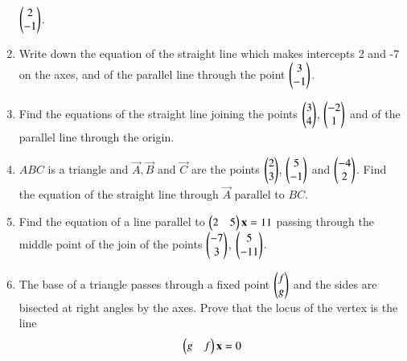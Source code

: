 \begin{enumerate}[label=\arabic*.,ref=\thesubsection.\theenumi]
$\begin{pmatrix}2\\-1\end{pmatrix}$.
\item Write down the equation of the straight line which makes intercepts 2 and -7 on the axes, and of the parallel line through
the point $\begin{pmatrix}3\\-1\end{pmatrix}$.
\item Find the equations of the straight line joining the points $\begin{pmatrix}3\\4\end{pmatrix}$, $\begin{pmatrix}-2\\1\end{pmatrix}$ and of the parallel line through
the origin.
\item $ABC$ is a triangle and $\vec{A}, \vec{B}$ and $\vec{C}$ are the points $\begin{pmatrix}2\\3\end{pmatrix}$, $\begin{pmatrix}5\\-1\end{pmatrix}$ and $\begin{pmatrix}-4\\2\end{pmatrix}$.  Find the equation
of the straight line through $\vec{A}$ parallel to $BC$.
\item Find the equation of a line parallel to $\begin{pmatrix}2 & 5\end{pmatrix}\mathbf{x}=11$ passing through the middle point of the join of the points $\begin{pmatrix}-7\\3\end{pmatrix}$, $\begin{pmatrix}5\\-11\end{pmatrix}$.
\item The base of a triangle passes through a fixed point $\begin{pmatrix}f\\g\end{pmatrix}$ and the sides are bisected at right angles by the axes.  Prove that the locus
of the vertex is the line
\begin{equation}
\begin{pmatrix}g & f\end{pmatrix}\mathbf{x} = 0
\end{equation}
\end{enumerate}
